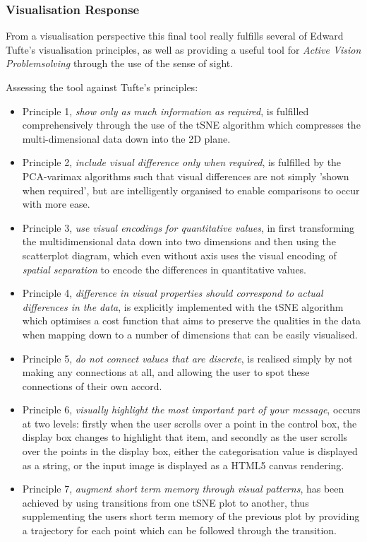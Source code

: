 \documentclass[a4paper,11pt,titlepage]{article}
\begin{document}
	\subsubsection{Visualisation Response}
	From a visualisation perspective this final tool really fulfills several of Edward Tufte's visualisation principles, as well as providing a useful tool for \textit{Active Vision Problemsolving} through the use of the sense of sight. 
	\par 
	Assessing the tool against Tufte's principles:
	\begin{itemize}
		\item Principle 1, \textit{show only as much information as required}, is fulfilled comprehensively through the use of the tSNE algorithm which compresses the multi-dimensional data down into the 2D plane.
		\item Principle 2, \textit{include visual difference only when required}, is fulfilled by the PCA-varimax algorithms such that visual differences are not simply 'shown when required', but are intelligently organised to enable comparisons to occur with more ease.
		\item Principle 3, \textit{use visual encodings for quantitative values}, in first transforming the multidimensional data down into two dimensions and then using the scatterplot diagram, which even without axis uses the visual encoding of \textit{spatial separation} to encode the differences in quantitative values.
		\item Principle 4, \textit{difference in visual properties should correspond to actual differences in the data}, is explicitly implemented with the tSNE algorithm which optimises a cost function that aims to preserve the qualities in the data when mapping down to a number of dimensions that can be easily visualised. 
		\item Principle 5, \textit{do not connect values that are discrete}, is realised simply by not making any connections at all, and allowing the user to spot these connections of their own accord.
		\item Principle 6, \textit{visually highlight the most important part of your message}, occurs at two levels: firstly when the user scrolls over a point in the control box, the display box changes to highlight that item, and secondly as the user scrolls over the points in the display box, either the categorisation value is displayed as a string, or the input image is displayed as a HTML5 canvas rendering. 
		\item Principle 7, \textit{augment short term memory through visual patterns}, has been achieved by using transitions from one tSNE plot to another, thus supplementing the users short term memory of the previous plot by providing a trajectory for each point which can be followed through the transition.

\end{itemize}
\end{document}

